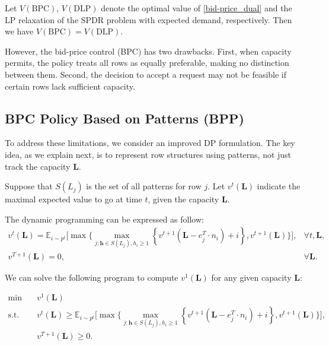 

Let $V(\text{BPC})$, $V(\text{DLP})$ denote the optimal value of \eqref{bid-price_dual} and the LP relaxation of the \textup{SPDR} problem with expected demand, respectively. Then we have $V(\text{BPC}) = V(\text{DLP})$.

However, the bid-price control (BPC) has two drawbacks. First, when capacity permits, the policy treats all rows as equally preferable, making no distinction between them. Second, the decision to accept a request may not be feasible if certain rows lack sufficient capacity.

\subsection{BPC Policy Based on Patterns (BPP)}
To address these limitations, we consider an improved DP formulation. The key idea, as we explain next, is to represent row structures using patterns, not just track the capacity $\bm{L}$.

Suppose that $S(L_{j})$ is the set of all patterns for row $j$. Let $v^t(\bm{L})$ indicate the maximal expected value to go at time $t$, given the capacity $\bm{L}$.

The dynamic programming can be expressed as follow:
\begin{equation}
    \begin{array}{lr}
    v^t(\bm{L}) = \mathbb{E}_{i \sim p^t}\Bigg[\max\Big\{\max_{j :\bm{h} \in S(L_{j}), 
    h_{i} \geqslant 1}\left\{v^{t+1}(\bm{L}- e_{j}^{T} \cdot n_{i})+ {i}\right\}, v^{t+1}(\bm{L})\Big\}\Bigg], & \forall t, \bm{L}, \\
    v^{T+1}(\bm{L})=0, & \forall \bm{L}.
    \end{array}
\end{equation}

We can solve the following program to compute $v^1(\bm{L})$ for any given capacity $\bm{L}$:

\begin{equation}\label{dp_bid}
    \begin{aligned}
    \min \quad & v^{1}(\bm{L}) \\
    \mathrm{s.t.} \quad & v^{t}(\bm{L}) \geq \mathbb{E}_{i \sim p^t}\Bigg[\max\Big\{\max_{j :\bm{h} \in S(L_{j}), 
    h_{i} \geqslant 1}\left\{v^{t+1}(\bm{L}- e_{j}^{T} \cdot n_{i})+ {i}\right\}, v^{t+1}(\bm{L})\Big\}\Bigg], \\
    & v^{T+1}(\bm{L}) \geq 0.
    \end{aligned}
\end{equation}

